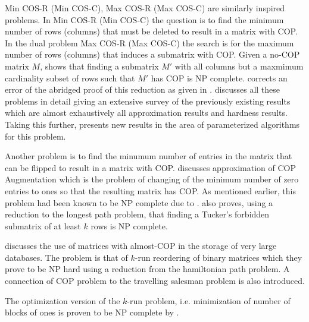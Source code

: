 \documentclass[MS,synopsis]{iitmdiss}
\begin{document}
{\sc Min COS-R (Min COS-C), Max COS-R (Max COS-C)} are similarly
inspired problems. In {\sc Min COS-R (Min COS-C)} the question is to
find the minimum number of rows (columns) that must be deleted to
result in a matrix with COP.  In the dual problem {\sc Max COS-R (Max
  COS-C)} the search is for the maximum number of rows (columns) that
induces a submatrix with COP. Given a no-COP matrix $M$,
\cite{b75-phd} shows that finding a submatrix $M'$ with all columns
but a maxmimum cardinality subset of rows such that $M'$ has COP is NP
complete. \cite{hg02} corrects an error of the abridged proof
of this reduction as given in \cite{gj79}.  \cite{d08phd} discusses
all these problems in detail giving an extensive survey of the
previously existing results which are almost exhaustively all
approximation results and hardness results. Taking this further,
\cite{d08phd} presents new results in the area of parameterized
algorithms for this problem.


Another problem is to find the minumum number of entries in the matrix
that can be flipped to result in a matrix with COP.  \cite{v85}
discusses approximation of {\sc COP Augmentation} which is the problem
of changing of the minimum number of zero entries to ones so that the
resulting matrix has COP. As mentioned earlier, this problem had been
known to be NP complete due to \cite{b75-phd}. \cite{v85} also proves,
using a reduction to the longest path problem,  that finding a Tucker's forbidden
submatrix of at least $k$ rows is NP complete.   

\cite{jkckv04} discusses the use of matrices with almost-COP in the
storage of very large databases.  The problem is that of $k$-run
reordering of binary matrices which they prove to be NP hard using a
reduction from the hamiltonian path problem.  A connection of COP
problem to the travelling salesman problem is also
introduced. 

The optimization version of the $k$-run problem, i.e. minimization of
number of blocks of ones is proven to be NP complete by
\cite{k77}. 
\end{document}
